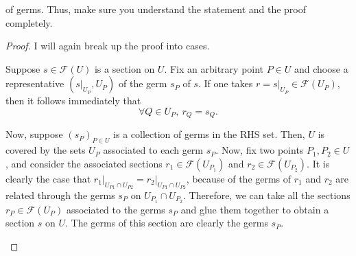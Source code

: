 of germs. Thus, make sure you understand the statement and the proof
completely.
\begin{proof}
  I will again break up the proof into cases.

  \begin{description}[style=nextline]
    \item[$\subseteq\big)$]
          Suppose $s\in\mathscr{F}(U)$ is a section on $U$. Fix an arbitrary
          point $P\in U$ and choose a representative $(s\vert_{U_{P}}, U_{P})$
          of the germ $s_{P}$ of $s$. If one takes $r=s\vert_{U_{P}}\in
          \mathscr{F}(U_{P})$, then it follows immediately that
          \[\forall Q\in U_{P},\ r_{Q}=s_{Q}.\]
    \item[$\supseteq\big)$]
          Now, suppose $(s_{P})_{P\in U}$ is a collection of germs in the
          RHS set. Then, $U$ is covered by the sets $U_{P}$ associated to
          each germ $s_{P}$. Now, fix two points $P_{1},P_{2}\in U$,
          and consider the associated sections $r_{1}\in\mathscr{F}(U_{P_{1}})$
          and $r_{2}\in\mathscr{F}(U_{P_{2}})$. It is clearly the case that
          $r_{1}\vert_{U_{P1}\cap U_{P2}}=r_{2}\vert_{U_{P1}\cap U_{P2}}$, because
          of the germs of $r_{1}$ and $r_{2}$ are related through the germs
          $s_{P}$ on $U_{P_{1}}\cap U_{P_{2}}$. Therefore, we can take all
          the sections $r_{P}\in\mathscr{F}(U_{P})$ associated to the germs
          $s_{P}$ and glue them together to obtain a section $s$ on $U$.
          The germs of this section are clearly the germs $s_{P}$.
  \end{description}
\end{proof}

